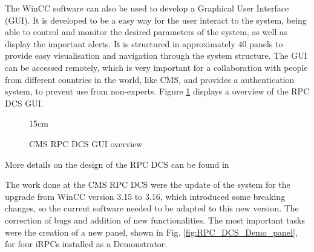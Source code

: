 The WinCC software can also be used to develop a Graphical User Interface (GUI). It is developed to be a easy way for the user interact to the system, being able to control and monitor the desired parameters of the system, as well as display the important alerts. It is structured in approximately 40 panels to provide easy visualisation and navigation through the system structure. The GUI can be accessed remotely, which is very important for a collaboration with people from different countries in the world, like CMS, and provides a authentication system, to prevent use from non-experts. Figure \ref{fig:RPC_DCS_GUI} displays a overview of the RPC DCS GUI.

\begin{figure}[!htm]{15cm} %
\caption{CMS RPC DCS GUI overview}%
\label{fig:RPC_DCS_GUI}
\end{figure}

More details on the design of the RPC DCS can be found in \cite{Polese:2010zz, Polese:2012zz}

The work done at the CMS RPC DCS were the update of the system for the upgrade from WinCC version 3.15 to 3.16, which introduced some breaking changes, so the current software needed to be adapted to this new version. The correction of bugs and addition of new functionalities. The most important tasks were the creation of a new panel, shown in Fig. \ref{fig:RPC_DCS_Demo_panel}, for four iRPCs installed as a Demonstrator.

